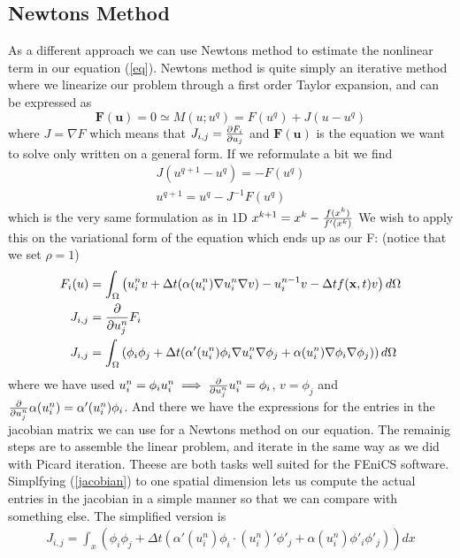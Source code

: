 \documentclass[a4paper,english, 10pt, twoside]{article}
\renewcommand{\d}{\partial}
\begin{document}
\subsection{Newtons Method}
As a different approach we can use Newtons method to estimate the nonlinear term in our equation (\ref{eq}). Newtons method is quite simply 
an iterative method where we linearize our problem through a first order Taylor expansion, and can be expressed as
$$
\mathbf{F}(\mathbf{u}) = 0 \simeq M(u;u^q) = F(u^q) +J(u-u^q)
$$
where $J=\nabla F$ which means that $J_{i,j} = {\d F_i \over \d u_j}$ and $\mathbf{F}(\mathbf{u})$ is the equation we want to solve 
only written on a general form. If we reformulate a bit we find
\begin{align*}
 J(u^{q+1}-u^q) = -F(u^q) \\
 u^{q+1} = u^q-J^{-1}F(u^q)
\end{align*}
which is the very same formulation as in 1D $x^{k+1} = x^k - {f(x^k) \over f'(x^k)}$
We wish to apply this on the variational form of the equation which ends up as our F: (notice that we set $\rho=1$)
\begin{align}
\nonumber
F_i(u) &= \int_\Omega\left(u_i^nv +\Delta t(\alpha(u_i^n)\nabla u_i^n \nabla v) -u_i^{n-1}v -\Delta tf(\mathbf{x},t)v 
 \right)d\Omega \\ \nonumber
 J_{i,j} &= {\d \over \d u_j^n}F_i \\
 J_{i,j} &= \int_\Omega\left(\phi_i\phi_j +\Delta t(\alpha'(u_i^n)\phi_i\nabla u_i^n \nabla \phi_j + 
 \alpha(u_i^n)\nabla \phi_i\nabla\phi_j) \right)d\Omega \label{jacobian}
\end{align}
where we have used $u_i^n = \phi_i u_i^n \implies {\d \over \d u_j^n}u_i^n = \phi_i$, $v=\phi_j$ and ${\d \over \d u_j^n}\alpha(u_i^n) = 
\alpha'(u_i^n)\phi_i$. And there we have the expressions for the entries in the jacobian matrix we can use for a Newtons method 
on our equation. The remainig steps are to assemble the linear problem, and iterate in the same way as we did with Picard iteration. 
Theese are both tasks well suited for the FEniCS software.\\ 
Simplfying (\ref{jacobian}) to one spatial dimension lets us compute the actual entries in the jacobian in a simple manner 
so that we can compare with something else. The simplified version is
\begin{align*}
  J_{i,j} = \int_x\left(\phi_i\phi_j +\Delta t(\alpha'(u_i^n)\phi_i\cdot(u_i^n)'\phi'_j + 
 \alpha(u_i^n)\phi'_i\phi'_j) \right)dx \\
\end{align*}
\end{document}
